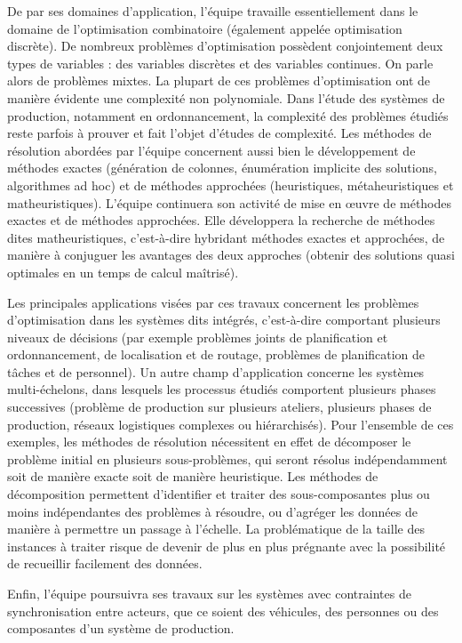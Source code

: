 	De par ses domaines d'application, l'équipe travaille essentiellement dans le domaine de l'optimisation combinatoire (également appelée optimisation discrète). De nombreux problèmes d'optimisation possèdent conjointement deux types de variables : des variables discrètes et des variables continues. On parle alors de problèmes mixtes. La plupart de ces problèmes d'optimisation ont de manière évidente une complexité non polynomiale. Dans l'étude des systèmes de production, notamment en ordonnancement, la complexité des problèmes étudiés reste parfois à prouver et fait l'objet d'études de complexité. Les méthodes de résolution abordées par l'équipe concernent aussi bien le développement de méthodes exactes (génération de colonnes, énumération implicite des solutions, algorithmes ad hoc) et de méthodes approchées (heuristiques, métaheuristiques et matheuristiques). L'équipe continuera son activité de mise en {\oe}uvre de méthodes exactes et de méthodes approchées. Elle développera la recherche de méthodes dites matheuristiques, c'est-à-dire hybridant méthodes exactes et approchées, de manière à conjuguer les avantages des deux approches (obtenir des solutions quasi optimales en un temps de calcul maîtrisé).
	
	Les principales applications visées par ces travaux concernent les problèmes d'optimisation dans les systèmes dits intégrés, c'est-à-dire comportant plusieurs niveaux de décisions (par exemple problèmes joints de planification et ordonnancement, de localisation et de routage, problèmes de planification de tâches et de personnel). Un autre champ d'application concerne les systèmes multi-échelons, 
	dans lesquels les processus étudiés comportent plusieurs phases successives (problème de production sur plusieurs ateliers, plusieurs phases de production, réseaux logistiques complexes ou hiérarchisés). 
	Pour l'ensemble de ces exemples, les méthodes de résolution nécessitent en effet de décomposer le problème initial en plusieurs sous-problèmes, qui seront résolus indépendamment soit de manière exacte soit de manière heuristique.  Les méthodes de décomposition permettent d'identifier et traiter des sous-composantes plus ou moins indépendantes des problèmes à résoudre, ou d'agréger les données de manière à permettre 
	un passage à l'échelle. La problématique de la taille des instances à traiter risque de devenir de plus en plus prégnante avec la possibilité de recueillir facilement des données. 
	
	Enfin, l'équipe poursuivra ses travaux sur les systèmes avec contraintes de synchronisation entre acteurs, que ce soient des véhicules, des personnes ou des composantes d'un système de production. 
	
